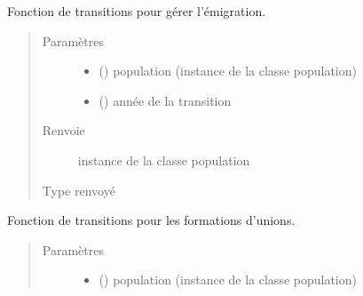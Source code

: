 \documentclass[letterpaper,10pt,french]{sphinxmanual}
\begin{document}
\begin{fulllineitems}
\begin{fulllineitems}
\end{fulllineitems}


\begin{fulllineitems}
\label{\detokenize{code:simgen.update.emig}}
Fonction de transitions pour gérer l’émigration.
\begin{quote}\begin{description}
\item[{Paramètres}] \leavevmode\begin{itemize}
\item {} 
 ({\hyperref[\detokenize{code:simgen.population}]{}}) \textendash{} population (instance de la classe population)

\item {} 
 () \textendash{} année de la transition

\end{itemize}

\item[{Renvoie}] \leavevmode
instance de la classe population

\item[{Type renvoyé}] \leavevmode
{\hyperref[\detokenize{code:simgen.population}]{}}

\end{description}\end{quote}

\end{fulllineitems}


\begin{fulllineitems}
\label{\detokenize{code:simgen.update.marriage}}
Fonction de transitions pour les formations d’unions.
\begin{quote}\begin{description}
\item[{Paramètres}] \leavevmode\begin{itemize}
\item {} 
 ({\hyperref[\detokenize{code:simgen.population}]{}}) \textendash{} population (instance de la classe population)


\end{itemize}
\end{description}
\end{quote}
\end{fulllineitems}
\end{fulllineitems}
\end{document}
